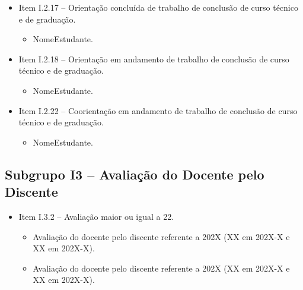\begin{itemize}
    \item Item I.2.17 -- Orientação concluída de trabalho de conclusão de curso técnico e de graduação.
    \begin{itemize}       
        \item NomeEstudante.
    \end{itemize}

    \item Item I.2.18 -- Orientação em andamento de trabalho de conclusão  de curso técnico e de graduação.
    \begin{itemize}
        \item NomeEstudante.
    \end{itemize}
    
    \item Item I.2.22 -- Coorientação em andamento de trabalho de conclusão de curso técnico e de graduação.
    \begin{itemize}
        \item NomeEstudante.
    \end{itemize}
\end{itemize}


\subsection{Subgrupo I3 -- Avaliação do Docente pelo Discente}

\begin{itemize}
    \item Item I.3.2 -- Avaliação maior ou igual a 22.
    \begin{itemize}
        \item Avaliação do docente pelo discente referente a 202X (XX em 202X-X e XX em 202X-X).
        
        \item Avaliação do docente pelo discente referente a 202X (XX em 202X-X e XX em 202X-X).
    \end{itemize}
\end{itemize}
